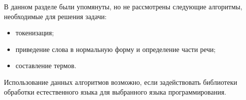 В данном разделе были упомянуты, но не рассмотрены следующие алгоритмы,
необходимые для решения задачи:
\begin{itemize}
    \item токенизация;
    \item приведение слова в нормальную форму и определение части речи;
    \item составление термов.
\end{itemize}

Использование данных алгоритмов возможно, если задействовать библиотеки
обработки естественного языка для выбранного языка программирования.
